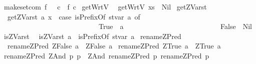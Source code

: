 \begin{isabellebody}
{\isacharbar}\ {\isachardoublequoteopen}make{\isacharunderscore}set{\isacharunderscore}com\ f\ {\isacharunderscore}\ {\isacharunderscore}\ c\ {\isacharequal}\ {\isacharparenleft}f\ c{\isacharparenright}{\isachardoublequoteclose}%
\isamarkuptrue%
\isamarkupfalse%
\ getWrtV\isanewline
{}\isanewline
\ \ {\isachardoublequoteopen}getWrtV\ xs\ {\isacharequal}\ Nil{\isachardoublequoteclose}%
\isamarkuptrue%
\isamarkupfalse%
\ get{\isacharunderscore}ZVar{\isacharunderscore}st\isanewline
{}\isanewline
\ \ {\isachardoublequoteopen}get{\isacharunderscore}ZVar{\isacharunderscore}st\ {\isacharparenleft}a{\isacharcomma}\ x{\isacharparenright}\ {\isacharequal}\ {\isacharparenleft}case\ {\isacharparenleft}isPrefixOf\ {\isacharprime}{\isacharprime}st{\isacharunderscore}var{\isacharunderscore}{\isacharprime}{\isacharprime}\ a{\isacharparenright}\ of\isanewline
\ \ \ \ \ \ \ \ \ \ \ \ \ \ \ \ \ \ \ \ \ \ \ \ \ \ \ \ True\ {\isasymRightarrow}\ {\isacharbrackleft}a{\isacharbrackright}\isanewline
\ \ \ \ \ \ \ \ \ \ \ \ \ \ \ \ \ \ \ \ \ \ \ \ \ \ {\isacharbar}\ False\ {\isasymRightarrow}\ Nil{\isacharparenright}{\isachardoublequoteclose}\isanewline
{}\isamarkupfalse%
\ is{\isacharunderscore}ZVar{\isacharunderscore}st\isanewline
{}\isanewline
\ \ {\isachardoublequoteopen}is{\isacharunderscore}ZVar{\isacharunderscore}st\ a\ {\isacharequal}\ isPrefixOf\ {\isacharprime}{\isacharprime}st{\isacharunderscore}var{\isacharunderscore}{\isacharprime}{\isacharprime}\ a{\isachardoublequoteclose}\isanewline
\isanewline
{}\isamarkupfalse%
\ rename{\isacharunderscore}ZPred\isanewline
{}\isanewline
\ \ {\isachardoublequoteopen}rename{\isacharunderscore}ZPred\ {\isacharparenleft}ZFalse\ a{\isacharparenright}\ {\isacharequal}\ {\isacharparenleft}ZFalse\ a{\isacharparenright}{\isachardoublequoteclose}\isanewline
{\isacharbar}\ {\isachardoublequoteopen}rename{\isacharunderscore}ZPred\ {\isacharparenleft}ZTrue\ a{\isacharparenright}\ {\isacharequal}\ {\isacharparenleft}ZTrue\ a{\isacharparenright}{\isachardoublequoteclose}\isanewline
{\isacharbar}\ {\isachardoublequoteopen}rename{\isacharunderscore}ZPred\ {\isacharparenleft}ZAnd\ p{}\ p{}{\isacharparenright}\ {\isacharequal}\ {\isacharparenleft}ZAnd\ {\isacharparenleft}rename{\isacharunderscore}ZPred\ p{}{\isacharparenright}\ {\isacharparenleft}rename{\isacharunderscore}ZPred\ p{}{\isacharparenright}{\isacharparenright}{\isachardoublequoteclose}\isanewline

\end{isabellebody}
